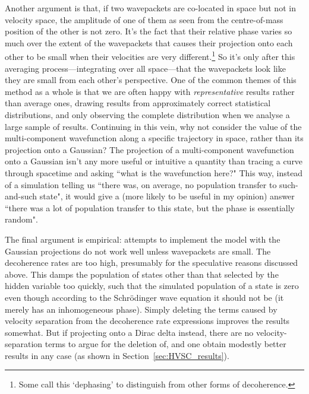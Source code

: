 Another argument is that, if two wavepackets are co-located in space but not in velocity space, the amplitude of one of them as seen from the centre-of-mass position of the other is not zero. It's the fact that their relative phase varies so much over the extent of the wavepackets that causes their projection onto each other to be small when their velocities are very different.\footnote{Some call this `dephasing' to distinguish from other forms of decoherence.} So it's only after this averaging process---integrating over all space---that the wavepackets look like they are small from each other's perspective. One of the common themes of this method as a whole is that we are often happy with \emph{representative} results rather than average ones, drawing results from approximately correct statistical distributions, and only observing the complete distribution when we analyse a large sample of results. Continuing in this vein, why not consider the value of the multi-component wavefunction along a specific trajectory in space, rather than its projection onto a Gaussian? The projection of a multi-component wavefunction onto a Gaussian isn't any more useful or intuitive a quantity than tracing a curve through spacetime and asking ``what is the wavefunction here?" This way, instead of a simulation telling us ``there was, on average, no population transfer to such-and-such state", it would give a (more likely to be useful in my opinion) answer ``there was a lot of population transfer to this state, but the phase is essentially random". 

The final argument is empirical: attempts to implement the model with the Gaussian projections do not work well unless wavepackets are small. The decoherence rates are too high, presumably for the speculative reasons discussed above. This damps the population of states other than that selected by the hidden variable too quickly, such that the simulated population of a state is zero even though according to the Schr\"odinger wave equation it should not be (it merely has an inhomogeneous phase). Simply deleting the terms caused by velocity separation from the decoherence rate expressions improves the results somewhat. But if projecting onto a Dirac delta instead, there are no velocity-separation terms to argue for the deletion of, and one obtain modestly better results in any case (as shown in Section~\ref{sec:HVSC_results}).

